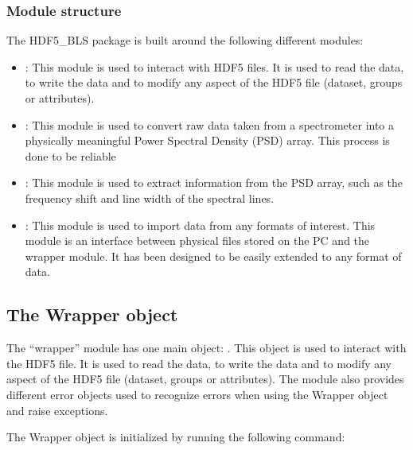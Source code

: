 \documentclass[letterpaper,10pt,english]{sphinxmanual}
\begin{document}
\subsubsection{Module structure}
\label{\detokenize{source/hdf5_bls_package:module-structure}}
\sphinxAtStartPar
The HDF5\_BLS package is built around the following different modules:
\begin{itemize}
\item {} 
\sphinxAtStartPar
{}: This module is used to interact with HDF5 files. It is used to read the data, to write the data and to modify any aspect of the HDF5 file (dataset, groups or attributes).

\item {} 
\sphinxAtStartPar
{}: This module is used to convert raw data taken from a spectrometer into a physically meaningful Power Spectral Density (PSD) array. This process is done to be reliable

\item {} 
\sphinxAtStartPar
{}: This module is used to extract information from the PSD array, such as the frequency shift and line width of the spectral lines.

\item {} 
\sphinxAtStartPar
{}: This module is used to import data from any formats of interest. This module is an interface between physical files stored on the PC and the wrapper module. It has been designed to be easily extended to any format of data.

\end{itemize}


\subsection{The Wrapper object}
\label{\detokenize{source/hdf5_bls_package:the-wrapper-object}}
\sphinxAtStartPar
The “wrapper” module has one main object: . This object is used to interact with the HDF5 file. It is used to read the data, to write the data and to modify any aspect of the HDF5 file (dataset, groups or attributes). The module also provides different error objects used to recognize errors when using the Wrapper object and raise exceptions.

\sphinxAtStartPar
The Wrapper object is initialized by running the following command:

\begin{sphinxVerbatim}[commandchars=\\\{\}]
  
\end{sphinxVerbatim}
\end{document}
